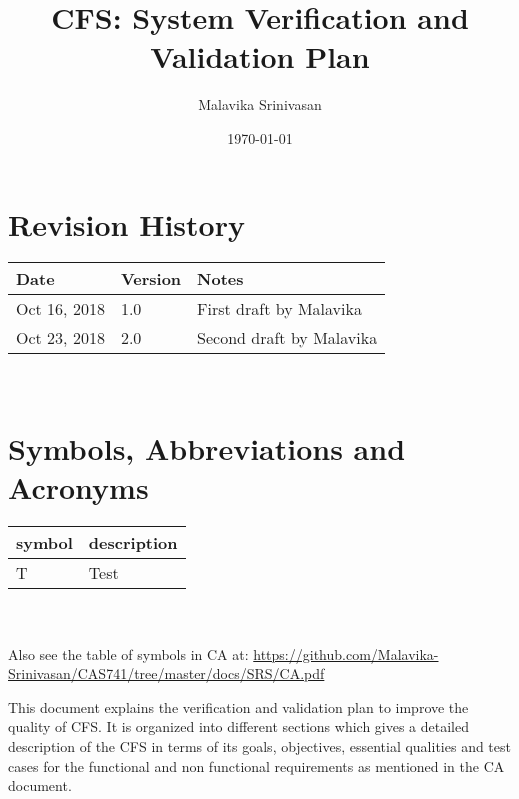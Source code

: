 \documentclass[12pt, titlepage]{article}
\newcommand{\famname}{CFS} %
\begin{document}
\title{CFS: System Verification and Validation Plan } 
\author{Malavika Srinivasan}
\date{\today}
	
\maketitle



\section{Revision History}

\begin{tabularx}{\textwidth}{p{3cm}p{2cm}X}
\toprule {\bf Date} & {\bf Version} & {\bf Notes}\\
\midrule
Oct 16, 2018 & 1.0 & First draft by Malavika\\
Oct 23, 2018 & 2.0 & Second draft by Malavika\\

\bottomrule
\end{tabularx}

~\newpage

\section{Symbols, Abbreviations and Acronyms}

\renewcommand{\arraystretch}{1.2}
\begin{tabular}{l l} 
  \toprule		
  \textbf{symbol} & \textbf{description}\\
  \midrule 
  T & Test\\
  \bottomrule
\end{tabular}\\
\\
Also see the table of symbols in CA at: \url{https://github.com/Malavika-Srinivasan/CAS741/tree/master/docs/SRS/CA.pdf}\\


\newpage

\tableofcontents

\listoftables

\listoffigures


\newpage



This document explains the verification and validation plan to improve the quality of \famname{}. It is organized into different sections which gives a detailed description of the \famname{} in terms of its goals, objectives, essential qualities and test cases for the functional and non functional requirements as mentioned in the CA document.
\end{document}
